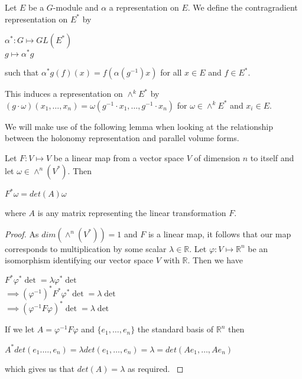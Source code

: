 \begin{definition}
    Let $E$ be a $G$-module and $\alpha$ a representation on $E$. We define
    the contragradient representation on $E^*$ by
    \begin{center}
        $\alpha^*: G \mapsto GL(E^*)$\\
        $g \mapsto \alpha^* g$
    \end{center}
    such that $\alpha^*g(f)(x) = f(\alpha(g^{-1})x)$ for all $x \in E$ and $f\in E^*$.
\end{definition}

\begin{remark}
    This induces a representation on $\wedge^kE^*$ by \\$(g\cdot \omega)(x_1, \dots , x_n) = \omega(g^{-1}\cdot x_1, \dots, g^{-1}\cdot x_n)$ for $\omega \in \wedge^k E^*$
        and $x_i \in E$.
\end{remark}

We will make use of the following lemma when looking at the relationship
between the holonomy representation and parallel volume forms.

\begin{lemma}
    Let $F: V \mapsto V$ be a linear map from a vector space $V$ of dimension $n$ to itself
    and let $\omega \in \wedge^n(V^*)$. Then
    \begin{center}
        $F^*\omega = det(A)\omega$
    \end{center}
    where $A$ is any matrix representing the linear transformation $F$.
    \label{lemma:pullback-form-linearmap}
\end{lemma}
\begin{proof}
    As $dim(\wedge^n(V^*)) = 1$ and $F$ is a linear map, it follows that our map corresponds to multiplication
    by some scalar $\lambda \in \mathbb{R}$. Let $\varphi: V \mapsto \mathbb{R}^n$ be an isomorphism identifying
    our vector space $V$ with $\mathbb{R}$. Then we have
    \begin{center}
        $F^*\varphi^*\det = \lambda\varphi^* \det$\\
        $\implies (\varphi^{-1})^* F^*\varphi^*\det = \lambda \det$\\
        $\implies (\varphi^{-1} F \varphi)^*\det = \lambda \det$
    \end{center}
    If we let $A = \varphi^{-1} F \varphi$ and $\{e_1, \dots , e_n\}$ the standard basis of $\mathbb{R}^n$
    then
    \begin{center}
        $A^*det(e_1. \dots , e_n) = \lambda det(e_1, \dots , e_n) = \lambda = det(Ae_1, \dots, Ae_n)$
    \end{center}
    which gives us that $det(A)= \lambda$ as required. \label{lemma:volume}
\end{proof}

